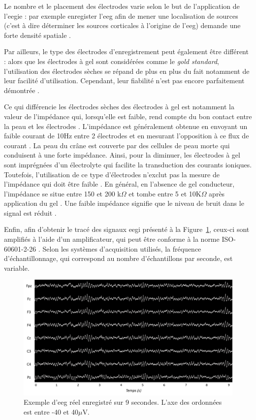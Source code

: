 Le nombre et le placement des électrodes varie selon le but de l'application de l'\gls{eegie} : par exemple enregister l'\gls{eeg} afin
de mener une localisation de sources (c'est à dire déterminer les sources corticales à l'origine de l'\gls{eeg}) demande une forte densité spatiale \citep{Lantz2003}. 

Par ailleurs, le type des électrodes d'enregistrement peut également être différent : 
alors que les électrodes à gel sont considérées comme le \textit{gold standard}, l'utilisation des électrodes sèches se répand de plus 
en plus du fait notamment de leur facilité d'utilisation. Cependant, leur fiabilité n'est pas encore parfaitement démontrée \citep{Lopez2014}. 

Ce qui différencie les électrodes sèches des électrodes à gel est notamment la valeur de l'impédance qui, lorsqu'elle est faible, rend compte du bon contact entre la peau et les électrodes \citep{Lopez2014}. 
L'impédance est généralement obtenue en envoyant un faible courant de 10Hz entre 2 électrodes et en mesurant l'opposition à ce flux de courant \citep{Kappenman2010}. La peau du crâne est 
couverte par des cellules de peau morte qui conduisent à une forte impédance.
Ainsi, pour la diminuer, les électrodes à gel sont imprégnées d'un électrolyte qui facilite la transduction des courants ioniques. Toutefois, l'utilisation de ce type d'électrodes 
n'exclut pas la mesure de l'impédance qui doit être faible \citep{Lopez2014}. En général, en l'absence de gel conducteur, l'impédance se
situe entre 150 et 200 k$\Omega$ et tombe entre 5 et 10K$\Omega$ après application du gel \citep{Lopez2014}. Une faible impédance signifie 
que le niveau de bruit dans le signal est réduit \citep{Kappenman2010}.

Enfin, afin d'obtenir le tracé des signaux \gls{eegi} présenté à la Figure~\ref{Figure:introduction_eeg_example}, ceux-ci sont amplifiés 
à l'aide d'un amplificateur, qui peut être conforme à la norme ISO-60601-2-26 \citep{ISO}. Selon les systèmes d'acquisition utilisés, la fréquence
d'échantillonnage, qui correspond au nombre d'échantillons par seconde, est variable.

\begin{figure}[h!]
  \centering
	\includegraphics[width=1\linewidth]{figures/chapter-1/introduction-eeg-example} 
  \caption[Exemple d'\gls{eeg} réel enregistré sur 9 secondes.]{Exemple d'\gls{eeg} réel enregistré sur 9 secondes. L'axe des ordonnées est entre -40 et 40$\mu$V.}
  \label{Figure:introduction_eeg_example}
\end{figure}

